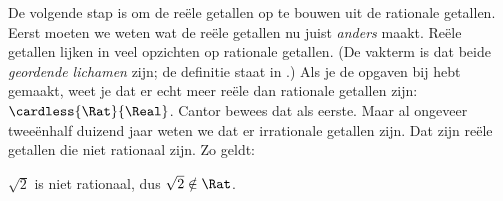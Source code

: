 \documentclass[openany]{memoir}
\begin{document}
De volgende stap is om de reële getallen op te bouwen uit de rationale
getallen. Eerst moeten we weten wat de reële getallen nu juist
\emph{anders} maakt.
Reële getallen lijken in veel opzichten op rationale getallen. (De
vakterm is dat beide \emph{geordende lichamen} zijn; de definitie staat
in .) Als je de opgaven bij
 hebt gemaakt, weet je dat er echt meer reële
dan rationale getallen zijn: $\cardless{\Rat}{\Real}$. Cantor bewees
dat als eerste. Maar al ongeveer tweeënhalf duizend jaar weten we dat
er irrationale getallen zijn. Dat zijn reële getallen die niet
rationaal zijn. Zo geldt:
\begin{thm}
$\sqrt{2}$ is niet rationaal, dus $\sqrt{2} \notin \Rat$.
\end{thm}
\end{document}
